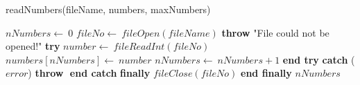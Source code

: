 \documentclass[a4paper,10pt]{article}
\begin{document}
\begin{algorithm}
\caption{readNumbers(fileName, numbers, maxNumbers)}
\begin{algorithmic}[5]

\STATE {}
\STATE {}
\STATE {}
  \STATE \(nNumbers\gets\ 0\)
  \STATE \(fileNo\gets\ fileOpen(fileName)\)
    \STATE \textbf{throw} \(\)"{}File could not be opened!"{}\(\)
  \ENDIF
  \STATE \textbf{try}  \BODY
      \STATE \(number\gets\ fileReadInt(fileNo)\)
      \STATE \(numbers[nNumbers]\gets\ number\)
      \STATE \(nNumbers\gets\ nNumbers+1\)
    \ENDWHILE
  \ENDBODY \STATE \textbf{end try}
  \STATE \textbf{catch} (\(error\)) \BODY
    \STATE \textbf{throw} \(\)
  \ENDBODY \STATE \textbf{end catch}
  \STATE \textbf{finally} \BODY
    \STATE \(fileClose(fileNo)\)
  \ENDBODY \STATE \textbf{end finally}
  \RETURN\(nNumbers\)

\end{algorithmic}
\end{algorithm}
\end{document}
